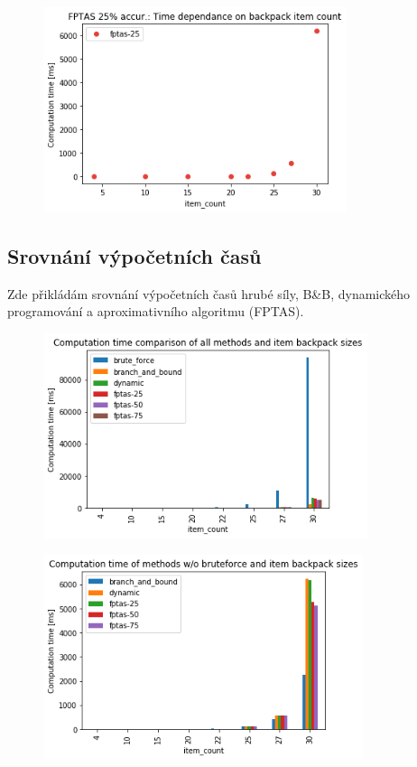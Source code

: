 \documentclass[a4paper,10pt,twocolumn]{article}
\begin{document}
\begin{figure}[H]
  \begin{center}
    \includegraphics[height=6cm]{graphs/fptas25_speed.png}
  \end{center}
\end{figure}



\subsection{Srovnání výpočetních časů}


Zde přikládám srovnání výpočetních časů hrubé síly, B\&B, dynamického programování a aproximativního algoritmu (FPTAS).

\begin{figure}[H]
  \begin{center}
    \includegraphics[height=6cm]{graphs/all_speed_comparison.png}
  \end{center}
\end{figure}

\begin{figure}[H]
  \begin{center}
    \includegraphics[height=6cm]{graphs/no_brute_speed_all.png}
  \end{center}
\end{figure}
\end{document}
